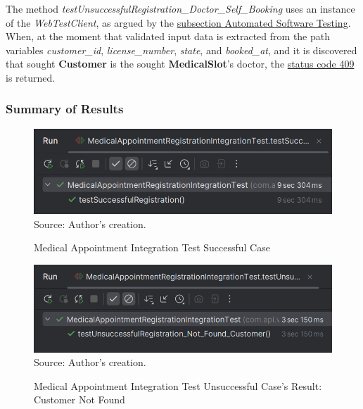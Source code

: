 The method \textit{testUnsuccessfulRegistration\_Doctor\_Self\_Booking} uses an instance of the \textit{WebTestClient}, as argued by the \hyperref[subsection:automated_software_testing]{subsection Automated Software Testing}. When, at the moment that validated input data is extracted from the path variables \textit{customer\_id}, \textit{license\_number}, \textit{state}, and \textit{booked\_at}, and it is discovered that sought \textbf{Customer} is the sought \textbf{MedicalSlot}'s doctor, the \hyperref[tab:summary_http_status_codes]{status code 409} is returned.


\subsubsection{Summary of Results}

\begin{figure}[H]
	\centering
	\caption{Medical Appointment Integration Test Successful Case}
	\includegraphics[width=1\linewidth]{figures/medical_appointment_registration_integration_test_successful_result.png}
	\label{medical_appointment_registration_integration_test_successful_result}
	\footnotesize Source: Author's creation.
\end{figure}

\begin{figure}[H]
	\centering
	\caption{Medical Appointment Integration Test Unsuccessful Case's Result: Customer Not Found}
	\includegraphics[width=1\linewidth]{figures/medical_appointment_registration_integration_test_unsuccessful_result_customer_not_found.png}
	\label{medical_appointment_registration_integration_test_unsuccessful_result_customer_not_found}
	\footnotesize Source: Author's creation.
\end{figure}


